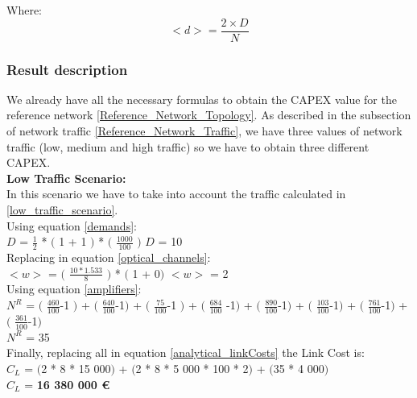 Where:
\begin{equation}
<d> = \frac{2 \times D}{N}
\label{average_demand}
\end{equation}


\subsubsection{Result description}

We already have all the necessary formulas to obtain the CAPEX value for the reference network \ref{Reference_Network_Topology}. As described in the subsection of network traffic \ref{Reference_Network_Traffic}, we have three values of network traffic (low, medium and high traffic) so we have to obtain three different CAPEX.\\

\textbf{Low Traffic Scenario:}\\
In this scenario we have to take into account the traffic calculated in \ref{low_traffic_scenario}.\\

Using equation \ref{demands}:\\

$D$ = $\frac{1}{2}$ * $($ 1 + 1 $)$ * $($ $\frac{1000}{100}$ $)$ \qquad \qquad $D$ = 10\\

Replacing in equation \ref{optical_channels}:\\

$<w>$ = $($ $\frac{10 * 1.533}{8}$ $)$ * $($ 1 + 0$)$ \qquad \qquad $<w>$ = 2\\

Using equation \ref{amplifiers}:\\

$N^R$ = $($ $\frac{460}{100}$-1 $)$ + $($ $\frac{640}{100}$-1$)$ + $($ $\frac{75}{100}$-1 $)$ + $($ $\frac{684}{100}$ -1$)$ + $($ $\frac{890}{100}$-1$)$ + $($ $\frac{103}{100}$-1$)$ + $($ $\frac{761}{100}$-1$)$ + $($ $\frac{361}{100}$-1$)$\\

$N^R$ = 35\\

Finally, replacing all in equation \ref{analytical_linkCosts} the Link Cost is:\\

$C_L$ = $($2 * 8 * 15 000$)$ + $($2 * 8 * 5 000 * 100 * 2$)$ + $($35 * 4 000$)$\\

$C_L$ = \textbf{16 380 000 \euro}\\

